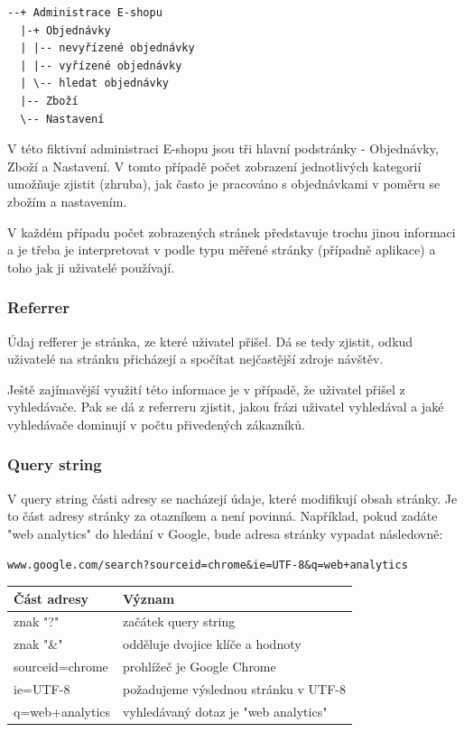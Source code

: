\documentclass[bc,female,java,dept456]{diploma}						%
\begin{document}
\begin{verbatim}
--+ Administrace E-shopu
  |-+ Objednávky
  | |-- nevyřízené objednávky
  | |-- vyřízené objednávky
  | \-- hledat objednávky
  |-- Zboží
  \-- Nastavení  
\end{verbatim}

V této fiktivní administraci E-shopu jsou tři hlavní podstránky - Objednávky, Zboží a Nastavení. V tomto případě počet zobrazení jednotlivých kategorií umožňuje zjistit (zhruba), jak často je pracováno s objednávkami v poměru se zbožím a nastavením.

V každém případu počet zobrazených stránek představuje trochu jinou informaci a je třeba je interpretovat v podle typu měřené stránky (případně aplikace) a toho jak ji uživatelé používají.

\subsubsection{Referrer}

Údaj refferer je stránka, ze které uživatel přišel. Dá se tedy zjistit, odkud uživatelé na stránku přicházejí a spočítat nejčastější zdroje návštěv.

Ještě zajímavější využití této informace je v případě, že uživatel přišel z vyhledávače. Pak se dá z referreru zjistit, jakou frázi uživatel vyhledával a jaké vyhledávače dominují v počtu přivedených zákazníků.

\subsubsection{Query string}

V query string části adresy se nacházejí údaje, které modifikují obsah stránky. Je to část adresy stránky za otazníkem a není povinná. Například, pokud zadáte "web analytics" do hledání v Google, bude adresa stránky vypadat následovně:

\begin{verbatim}
www.google.com/search?sourceid=chrome&ie=UTF-8&q=web+analytics
\end{verbatim}

\begin{tabular}{ll}
	Část adresy & Význam \\	\hline \smallskip
	znak "?" & začátek query string \\ \smallskip
	znak "\&" & odděluje dvojice klíče a hodnoty \\ \smallskip
	sourceid=chrome & prohlížeč je Google Chrome \\ \smallskip
	ie=UTF-8 & požadujeme výslednou stránku v UTF-8 \\ \smallskip
	q=web+analytics & vyhledávaný dotaz je "web analytics"
\end{tabular}
\end{document}
